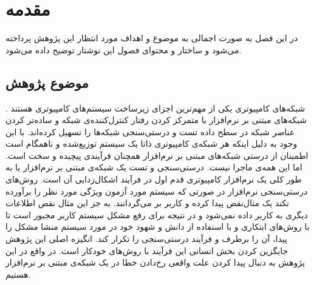 \chapter{مقدمه}
در این فصل به صورت اجمالی به موضوع و اهداف مورد انتظار این پژوهش پرداخته می‌شود و ساختار و محتوای فصول این نوشتار توضیح داده می‌شود.
\section{موضوع پژوهش}
شبکه‌های کامپیوتری یکی از مهم‌ترین اجزای زیرساخت سیستم‌های کامپیوتری هستند
\cite{foerster2018survey}.
شبکه‌های مبتنی بر نرم‌افزار
با متمرکز کردن رفتار کنترل‌کننده‌ی شبکه و ساده‌تر کردن عناصر شبکه در سطح داده
تست و درستی‌سنجی شبکه‌ها را تسهیل کرده‌اند.
با این وجود به دلیل اینکه هر شبکه‌‌ی کامپیوتری ذاتا یک سیستم توزیع‌شده و  ناهمگام
است
اطمینان از درستی شبکه‌های مبتنی بر نرم‌افزار همچنان فرآیندی پیچیده و سخت است.
اما این همه‌ی ماجرا نیست.
درستی‌سنجی
و تست یک شبکه‌ی مبتنی بر نرم‌افزار یا به طور کلی یک نرم‌افزار کامپیوتری قدم اول در فرآیند اشکال‌زدایی
آن است.
روش‌های درستی‌سنجی نرم‌افزار در صورتی که سیستم مورد آزمون ویژگی
مورد نظر را برآورده نکند یک مثال‌نقض
پیدا کرده و کاربر بر می‌گردانند.
به جز این مثال نقض اطلاعات دیگری به کاربر داده نمی‌شود و در نتیجه برای رفع مشکل سیستم کاربر مجبور است تا با روش‌های ابتکاری و با استفاده از دانش و شهود خود در مورد سیستم منشا مشکل را پیدا، آن را برطرف و فرآیند درستی‌سنجی را تکرار کند.
انگیزه اصلی این پژوهش جایگزین کردن بخش انسانی این فرآیند با روش‌های خودکار است.
در واقع در این پژوهش به دنبال پیدا کردن علت واقعی رخ‌دادن خطا در یک شبکه‌ی مبتنی بر نرم‌افزار هستیم.
\begin{figure}
    \centering
    \caption{ }
    \label{fig:blacklist:consistent}
\end{figure}


